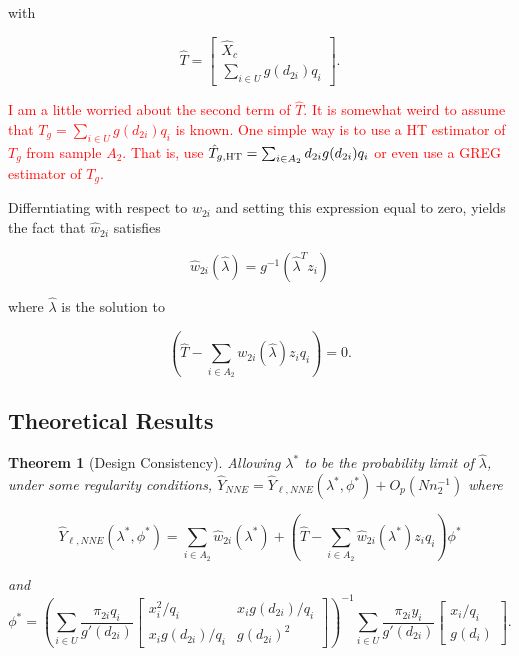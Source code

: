 \documentclass[12pt]{article}
\newtheorem{theorem}{Theorem}
\begin{document}
with 

$$\hat T = 
\begin{bmatrix}
  \hat X_c \\ \sum_{i \in U} g(d_{2i}) q_i
\end{bmatrix}.
$$


\textcolor{red}{I am a little worried about the second term of $\hat{T}$. It is
  somewhat weird to assume that $T_g= \sum_{i \in U} g(d_{2i}) q_i$ is known.
  One simple way is to use a HT estimator  of $T_g$ from sample $A_2$. That is,
  use $\hat{T}_{g, {\rm HT}} = \sum_{i \in A_2} d_{2i} g( d_{2i}) q_i$ or even
  use a GREG estimator of $T_g$. 
}

Differntiating with respect to $w_{2i}$ and setting this expression equal to
zero, yields the fact that $\hat w_{2i}$ satisfies 

$$ \hat w_{2i}(\hat \lambda) = g^{-1}(\hat \lambda^T z_i) $$

where $\hat \lambda$ is the solution to

\begin{equation}\label{eq:lamdc2}
  \left( \hat T - \sum_{i \in A_2} w_{2i}(\hat \lambda) z_i q_i\right) = 0.
\end{equation}

\subsection{Theoretical Results}

\begin{theorem}[Design Consistency]\label{thm:dc2}
  Allowing $\lambda^*$ to be the probability limit of $\hat \lambda$,
  under some regularity conditions, $\hat Y_{NNE} = \hat Y_{\ell, NNE}(\lambda^*,
  \phi^*) + O_p(Nn_2^{-1})$ where

  $$\hat Y_{\ell, NNE}(\lambda^*, \phi^*) = \sum_{i \in A_2} \hat w_{2i}(
  \lambda^*) + \left(\hat T - \sum_{i \in A_2} \hat w_{2i}(\lambda^*) z_i q_i\right)
  \phi^*$$

  and 
  $$\phi^* =
  \left(\sum_{i \in U} \frac{\pi_{2i} q_i}{g'(d_{2i})} 
  \begin{bmatrix}
    x_i^2 / q_i & x_i g(d_{2i}) / q_i \\
    x_i g(d_{2i}) / q_i & g(d_{2i})^2
  \end{bmatrix}
  \right)^{-1}
  \sum_{i \in U} \frac{\pi_{2i} y_i}{g'(d_{2i})} 
  \begin{bmatrix} x_i / q_i \\ g(d_i) \end{bmatrix}.
  $$
\end{theorem}
\end{document}
